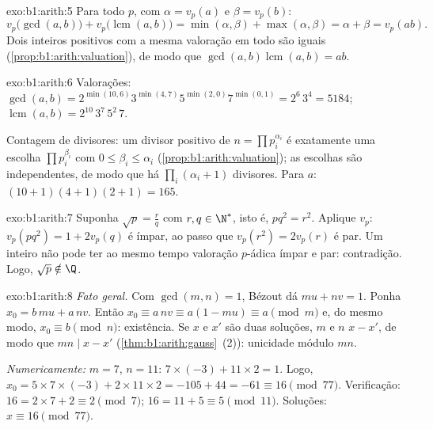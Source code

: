 \begin{solution}{exo:b1:arith:5}
Para todo  $p$, com $\alpha = v_p(a)$ e $\beta = v_p(b)$:
\[
v_p\bigl(\gcd(a,b)\bigr) + v_p\bigl(\operatorname{lcm}(a,b)\bigr)
= \min(\alpha, \beta) + \max(\alpha, \beta)
= \alpha + \beta = v_p(ab) .
\]
Dois inteiros positivos com a mesma valoração em todo  são iguais
(\cref{prop:b1:arith:valuation}), de modo que $\gcd(a,b)\operatorname{lcm}(a,b)
= ab$.
\end{solution}

\begin{solution}{exo:b1:arith:6}
Valorações: $\gcd(a, b) = 2^{\min(10,6)} 3^{\min(4,7)} 5^{\min(2,0)}
7^{\min(0,1)} = 2^6\, 3^4 = 5184$;
$\operatorname{lcm}(a,b) = 2^{10}\, 3^7\, 5^2\, 7$.

Contagem de divisores: um divisor positivo de $n = \prod p_i^{\alpha_i}$ é
exatamente uma escolha $\prod p_i^{\beta_i}$ com $0 \leq \beta_i \leq
\alpha_i$ (\cref{prop:b1:arith:valuation}); as escolhas são
independentes, de modo que há $\prod_i (\alpha_i + 1)$ divisores. Para $a$:
$(10+1)(4+1)(2+1) = 165$.
\end{solution}

\begin{solution}{exo:b1:arith:7}
Suponha $\sqrt p = \frac rq$ com $r, q \in \N^*$, isto é, $p q^2 =
r^2$. Aplique $v_p$: $v_p(pq^2) = 1 + 2v_p(q)$ é ímpar, ao passo que $v_p(r^2)
= 2 v_p(r)$ é par. Um inteiro não pode ter ao mesmo tempo valoração
$p$-ádica ímpar e par: contradição. Logo, $\sqrt p \notin \Q$.
\end{solution}

\begin{solution}{exo:b1:arith:8}
\emph{Fato geral.} Com $\gcd(m,n) = 1$, Bézout dá $mu + nv = 1$.
Ponha $x_0 = b\,mu + a\,nv$. Então $x_0 \equiv a\,nv \equiv a(1 - mu)
\equiv a \pmod m$ e, do mesmo modo, $x_0 \equiv b \pmod n$: existência. Se
$x$ e $x'$ são duas soluções, $m$ e $n$  $x - x'$, de modo que
$mn \mid x - x'$ (\cref{thm:b1:arith:gauss}~(2)): unicidade módulo
$mn$.

\emph{Numericamente:} $m = 7$, $n = 11$: $7 \times (-3) + 11 \times 2 =
1$. Logo, $x_0 = 5 \times 7 \times (-3) + 2 \times 11 \times 2 = -105 +
44 = -61 \equiv 16 \pmod{77}$. Verificação: $16 = 2\times 7 + 2 \equiv 2
\pmod 7$; $16 = 11 + 5 \equiv 5 \pmod{11}$. Soluções: $x \equiv 16
\pmod{77}$.
\end{solution}

